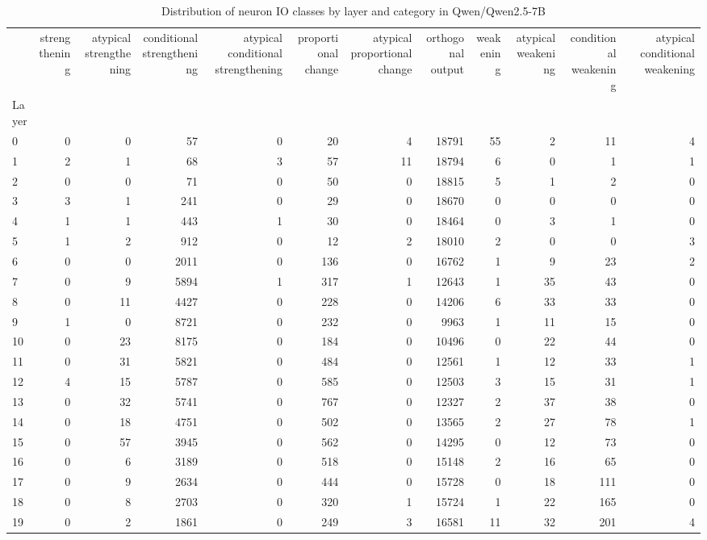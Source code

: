 \begin{table}
\caption{Distribution of neuron IO classes by layer and category in Qwen/Qwen2.5-7B}
\label{tab:Qwen/Qwen2.5-7B}
\begin{tabular}{lrrrrrrrrrrr}
 & strengthening & atypical strengthening & conditional strengthening & atypical conditional strengthening & proportional change & atypical proportional change & orthogonal output & weakening & atypical weakening & conditional weakening & atypical conditional weakening \\
Layer &  &  &  &  &  &  &  &  &  &  &  \\
0 & 0 & 0 & 57 & 0 & 20 & 4 & 18791 & 55 & 2 & 11 & 4 \\
1 & 2 & 1 & 68 & 3 & 57 & 11 & 18794 & 6 & 0 & 1 & 1 \\
2 & 0 & 0 & 71 & 0 & 50 & 0 & 18815 & 5 & 1 & 2 & 0 \\
3 & 3 & 1 & 241 & 0 & 29 & 0 & 18670 & 0 & 0 & 0 & 0 \\
4 & 1 & 1 & 443 & 1 & 30 & 0 & 18464 & 0 & 3 & 1 & 0 \\
5 & 1 & 2 & 912 & 0 & 12 & 2 & 18010 & 2 & 0 & 0 & 3 \\
6 & 0 & 0 & 2011 & 0 & 136 & 0 & 16762 & 1 & 9 & 23 & 2 \\
7 & 0 & 9 & 5894 & 1 & 317 & 1 & 12643 & 1 & 35 & 43 & 0 \\
8 & 0 & 11 & 4427 & 0 & 228 & 0 & 14206 & 6 & 33 & 33 & 0 \\
9 & 1 & 0 & 8721 & 0 & 232 & 0 & 9963 & 1 & 11 & 15 & 0 \\
10 & 0 & 23 & 8175 & 0 & 184 & 0 & 10496 & 0 & 22 & 44 & 0 \\
11 & 0 & 31 & 5821 & 0 & 484 & 0 & 12561 & 1 & 12 & 33 & 1 \\
12 & 4 & 15 & 5787 & 0 & 585 & 0 & 12503 & 3 & 15 & 31 & 1 \\
13 & 0 & 32 & 5741 & 0 & 767 & 0 & 12327 & 2 & 37 & 38 & 0 \\
14 & 0 & 18 & 4751 & 0 & 502 & 0 & 13565 & 2 & 27 & 78 & 1 \\
15 & 0 & 57 & 3945 & 0 & 562 & 0 & 14295 & 0 & 12 & 73 & 0 \\
16 & 0 & 6 & 3189 & 0 & 518 & 0 & 15148 & 2 & 16 & 65 & 0 \\
17 & 0 & 9 & 2634 & 0 & 444 & 0 & 15728 & 0 & 18 & 111 & 0 \\
18 & 0 & 8 & 2703 & 0 & 320 & 1 & 15724 & 1 & 22 & 165 & 0 \\
19 & 0 & 2 & 1861 & 0 & 249 & 3 & 16581 & 11 & 32 & 201 & 4 \\

\end{tabular}
\end{table}
